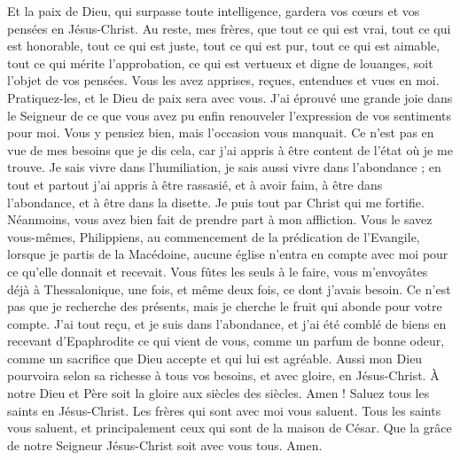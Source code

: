 \begin{multicols}{2}
Et la paix de Dieu, qui surpasse toute intelligence, gardera vos cœurs et vos pensées en Jésus-Christ.
Au reste, mes frères, que tout ce qui est vrai, tout ce qui est honorable, tout ce qui est juste, tout ce qui est pur, tout ce qui est aimable, tout ce qui mérite l’approbation, ce qui est vertueux et digne de louanges, soit l’objet de vos pensées.
Vous les avez apprises, reçues, entendues et vues en moi. Pratiquez-les, et le Dieu de paix sera avec vous.
J’ai éprouvé une grande joie dans le Seigneur de ce que vous avez pu enfin renouveler l’expression de vos sentiments pour moi. Vous y pensiez bien, mais l’occasion vous manquait.
Ce n’est pas en vue de mes besoins que je dis cela, car j’ai appris à être content de l’état où je me trouve.
Je sais vivre dans l’humiliation, je sais aussi vivre dans l'abondance ; en tout et partout j’ai appris à être rassasié, et à avoir faim, à être dans l'abondance, et à être dans la disette.
Je puis tout par Christ qui me fortifie.
Néanmoins, vous avez bien fait de prendre part à mon affliction.
Vous le savez vous-mêmes, Philippiens, au commencement de la prédication de l’Evangile, lorsque je partis de la Macédoine, aucune église n’entra en compte avec moi pour ce qu’elle donnait et recevait.
Vous fûtes les seuls à le faire, vous m’envoyâtes déjà à Thessalonique, une fois, et même deux fois, ce dont j'avais besoin.
Ce n'est pas que je recherche des présents, mais je cherche le fruit qui abonde pour votre compte.
J'ai tout reçu, et je suis dans l'abondance, et j'ai été comblé de biens en recevant d'Epaphrodite ce qui vient de vous, comme un parfum de bonne odeur, comme un sacrifice que Dieu accepte et qui lui est agréable.
Aussi mon Dieu pourvoira selon sa richesse à tous vos besoins, et avec gloire, en Jésus-Christ.
\TextTitle{[Conclusion]}
À notre Dieu et Père soit la gloire aux siècles des siècles. Amen !
Saluez tous les saints en Jésus-Christ. Les frères qui sont avec moi vous saluent.
Tous les saints vous saluent, et principalement ceux qui sont de la maison de César.
Que la grâce de notre Seigneur Jésus-Christ soit avec vous tous. Amen.
\PPE{}
\end{multicols}
